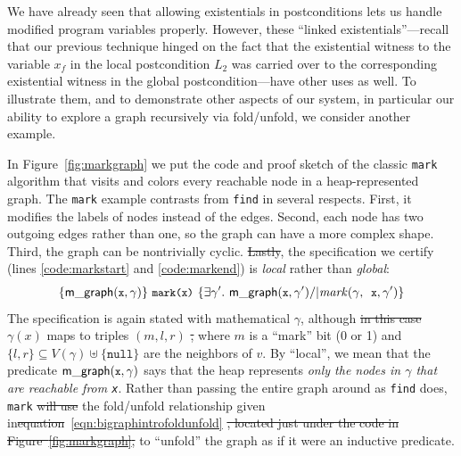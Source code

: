 \documentclass[acmsmall,screen]{acmart}  %
\newcommand{\li}[1]{{\texttt{\small #1}}} %
\newcommand{\tx}[1]{\text{#1}}
\newcommand{\p}[1]{\ensuremath{\mathsf{#1}}} \newcommand{\m}[1]{\ensuremath{\mathit{#1}}} \newcommand{\ma}[1]{\ensuremath{\mathcal{#1}}} \let\ramify\lightning
\providecommand{\DIFadd}[1]{{\protect\color{blue}\uwave{#1}}} %
\providecommand{\DIFdel}[1]{{\protect\color{red}\sout{#1}}}                      %
\providecommand{\DIFaddbegin}{} %
\providecommand{\DIFaddend}{} %
\providecommand{\DIFdelbegin}{} %
\providecommand{\DIFdelend}{} %
\newcommand{\DIFscaledelfig}{0.5}
\newlength{\DIFdelgraphicswidth} %
\newlength{\DIFdelgraphicsheight} %
\newcommand{\DIFaddincludegraphics}[2][]{{\color{blue}\fbox{\DIFOincludegraphics[#1]{#2}}}} %
\newcommand{\DIFdelincludegraphics}[2][]{%
\sbox{\DIFdelgraphicsbox}{\DIFOincludegraphics[#1]{#2}}%
\settoboxwidth{\DIFdelgraphicswidth}{\DIFdelgraphicsbox} %
\settoboxtotalheight{\DIFdelgraphicsheight}{\DIFdelgraphicsbox} %
\scalebox{\DIFscaledelfig}{%
\parbox[b]{\DIFdelgraphicswidth}{\usebox{\DIFdelgraphicsbox}\\[-\baselineskip] \rule{\DIFdelgraphicswidth}{0em}}\llap{\resizebox{\DIFdelgraphicswidth}{\DIFdelgraphicsheight}{%
\setlength{\unitlength}{\DIFdelgraphicswidth}%
\begin{picture}(1,1)%
\thicklines\linethickness{2pt} %
{\color[rgb]{1,0,0}\put(0,0){\framebox(1,1){}}}%
{\color[rgb]{1,0,0}\put(0,0){\line( 1,1){1}}}%
{\color[rgb]{1,0,0}\put(0,1){\line(1,-1){1}}}%
\end{picture}%
}\hspace*{3pt}}} %
} %
\DeclareRobustCommand{\DIFaddbegin}{\DIFOaddbegin \let\includegraphics\DIFaddincludegraphics} %
\DeclareRobustCommand{\DIFaddend}{\DIFOaddend \let\includegraphics\DIFOincludegraphics} %
\DeclareRobustCommand{\DIFdelbegin}{\DIFOdelbegin \let\includegraphics\DIFdelincludegraphics} %
\DeclareRobustCommand{\DIFdelend}{\DIFOaddend \let\includegraphics\DIFOincludegraphics} %
\begin{document}
\DIFaddbegin \renewcommand{\tx}[1]{\text{#1}}

\DIFaddend 

 
We have already seen that allowing existentials in postconditions lets us handle modified program
variables properly.  However, these ``linked existentials''---recall that our previous technique
hinged on the fact that the existential witness to the variable $x_f$ in the local postcondition
$L_2$ was carried over to the corresponding existential witness in the global postcondition---have
other uses as well.  To illustrate them, and to demonstrate other aspects of our system, in particular our ability to explore a graph recursively via fold/unfold, we consider another example.

In Figure~\ref{fig:markgraph} we put the code and proof sketch of the classic \li{mark} algorithm that visits and colors every reachable node in a heap-represented graph.  The \li{mark} example contrasts from \li{find} in several respects.  First, it modifies the labels of nodes instead of the edges.  Second, each node has two outgoing edges rather than one, so the graph can have a more complex shape.  Third, the graph can be nontrivially cyclic.  \DIFdelbegin \DIFdel{Lastly}\DIFdelend \DIFaddbegin \DIFadd{Fourth}\DIFaddend , the specification we certify (lines \ref{code:markstart} and \ref{code:markend}) is \emph{local} rather than \emph{global}:
\DIFdelbegin %
\DIFdelend \DIFaddbegin \vspace*{-2.2ex}
\DIFaddend \[
\{\p{m\_graph}(\li{x},\gamma)\}~\li{mark(x)}~\{\exists \gamma'.~ \p{m\_graph}(\li{x},\gamma') /| \m{mark}(\gamma, \li{x}, \gamma')\}
\vspace*{-1ex}
\]
The specification is again stated with mathematical $\gamma$, although \DIFdelbegin \DIFdel{in this case $\gamma(x)$ }\DIFdelend \DIFaddbegin \DIFadd{$\gamma(\li{x})$ now }\DIFaddend maps to triples $(m,l,r)$ \DIFdelbegin \DIFdel{, }\DIFdelend where $m$ is a ``mark'' bit (0 or 1) and $\{l,r\} \subseteq V(\gamma) \uplus \{\mathtt{null}\}$ are the neighbors of \DIFdelbegin \DIFdel{$v$}\DIFdelend \DIFaddbegin \DIFadd{$\li{x}$}\DIFaddend .  By ``local'', we mean that the predicate $\p{m\_graph}(\li{x},\gamma)$ says that the heap represents \emph{only the nodes in $\gamma$ that are reachable from \li{x}}.  Rather than passing the entire graph around as \li{find} does, \li{mark} \DIFdelbegin \DIFdel{will use }\DIFdelend \DIFaddbegin \DIFadd{uses }\DIFaddend the fold/unfold relationship given in\DIFdelbegin \DIFdel{equation}\DIFdelend ~\eqref{eqn:bigraphintrofoldunfold} \DIFdelbegin \DIFdel{, located just under the code in Figure~\ref{fig:markgraph}, }\DIFdelend to ``unfold'' the graph as if it were an inductive predicate.
\end{document}
